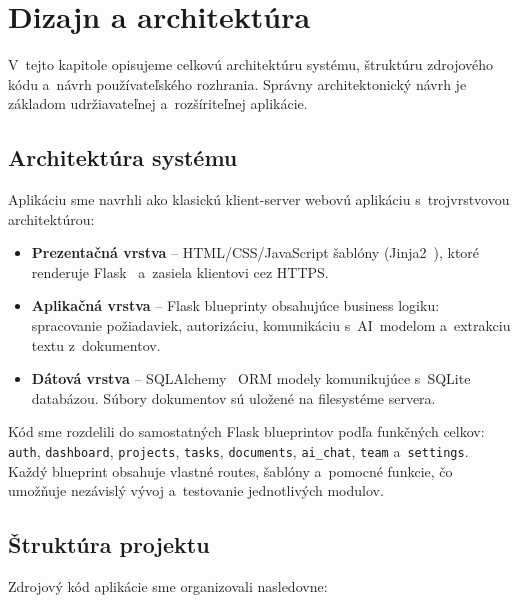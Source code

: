\chapter{Dizajn a architektúra}

        V~tejto kapitole opisujeme celkovú architektúru systému, štruktúru zdrojového kódu
a~návrh používateľského rozhrania. Správny architektonický návrh je základom udržiavateľnej
a~rozšíriteľnej aplikácie.

\section{Architektúra systému}

        Aplikáciu sme navrhli ako klasickú klient-server webovú aplikáciu s~trojvrstvovou
architektúrou:

\begin{itemize}
  \item \textbf{Prezentačná vrstva} -- HTML/CSS/JavaScript šablóny (Jinja2~\cite{jinja2_docs}), ktoré
        renderuje Flask~\cite{flask_docs} a~zasiela klientovi cez HTTPS.
  \item \textbf{Aplikačná vrstva} -- Flask blueprinty obsahujúce business logiku:
        spracovanie požiadaviek, autorizáciu, komunikáciu s~AI~modelom a~extrakciu
        textu z~dokumentov.
  \item \textbf{Dátová vrstva} -- SQLAlchemy~\cite{sqlalchemy_docs} ORM modely komunikujúce s~SQLite~\cite{sqlite_org}
        databázou. Súbory dokumentov sú uložené na filesystéme servera.
\end{itemize}

        Kód sme rozdelili do samostatných Flask blueprintov podľa funkčných celkov:
\texttt{auth}, \texttt{dashboard}, \texttt{projects}, \texttt{tasks}, \texttt{documents},
\texttt{ai\_chat}, \texttt{team} a~\texttt{settings}. Každý blueprint obsahuje vlastné
routes, šablóny a~pomocné funkcie, čo umožňuje nezávislý vývoj a~testovanie jednotlivých
modulov.

\section{Štruktúra projektu}

        Zdrojový kód aplikácie sme organizovali nasledovne:

